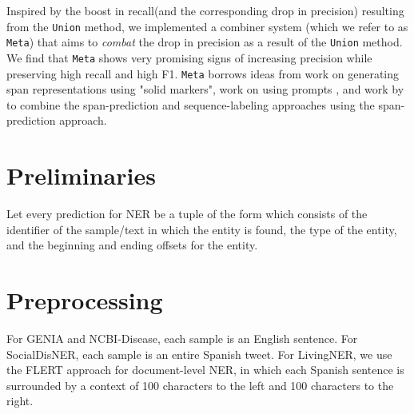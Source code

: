 \documentclass[11pt]{article}
\begin{document}
\par Inspired by the boost in recall(and the corresponding drop in precision) resulting from the \texttt{Union} method, we implemented a combiner system
(which we refer to as \texttt{Meta}) that aims to \textit{combat} the drop in precision as a result of the \texttt{Union} method. We find that \texttt{Meta} shows very promising signs of increasing precision while preserving high recall and high F1. \texttt{Meta} borrows ideas from work on generating span representations using "solid markers"\cite{baldini-soares-etal-2019-matching, xiao-etal-2020-denoising, ye-etal-2022-packed}, work on using prompts
\cite{li-etal-2020-unified}, and work by \cite{spanner} to combine the span-prediction and sequence-labeling approaches using the span-prediction approach.


\section{Preliminaries}\label{prelims}
 Let every prediction  for NER be a tuple of the form  which consists of the identifier of the sample/text in which the entity is found, the type of the entity, and the beginning and ending offsets for the entity.

\section{Preprocessing}
For GENIA and NCBI-Disease, each sample is an English sentence. For SocialDisNER, each sample is an entire Spanish tweet. For LivingNER, we use the FLERT\cite{schweter2020flert} approach for document-level NER, in which each Spanish sentence is surrounded by a context of 100 characters to the left and 100 characters to the right.
\end{document}
